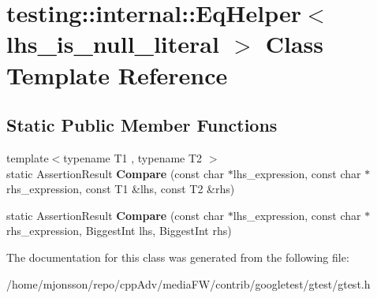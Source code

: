 \hypertarget{classtesting_1_1internal_1_1EqHelper}{}\section{testing\+:\+:internal\+:\+:Eq\+Helper$<$ lhs\+\_\+is\+\_\+null\+\_\+literal $>$ Class Template Reference}
\label{classtesting_1_1internal_1_1EqHelper}
\subsection*{Static Public Member Functions}
\begin{DoxyCompactItemize}
\item 
\mbox{\label{classtesting_1_1internal_1_1EqHelper_ae3572c7374534a916b9117efaa89f33f}} 
{\footnotesize template$<$typename T1 , typename T2 $>$ }\\static Assertion\+Result {\bfseries Compare} (const char $\ast$lhs\+\_\+expression, const char $\ast$rhs\+\_\+expression, const T1 \&lhs, const T2 \&rhs)
\item 
\mbox{\label{classtesting_1_1internal_1_1EqHelper_aaa42c0059bb3dcc43d556243febb5f1c}} 
static Assertion\+Result {\bfseries Compare} (const char $\ast$lhs\+\_\+expression, const char $\ast$rhs\+\_\+expression, Biggest\+Int lhs, Biggest\+Int rhs)
\end{DoxyCompactItemize}


The documentation for this class was generated from the following file\+:\begin{DoxyCompactItemize}
\item 
/home/mjonsson/repo/cpp\+Adv/media\+F\+W/contrib/googletest/gtest/gtest.\+h\end{DoxyCompactItemize}
